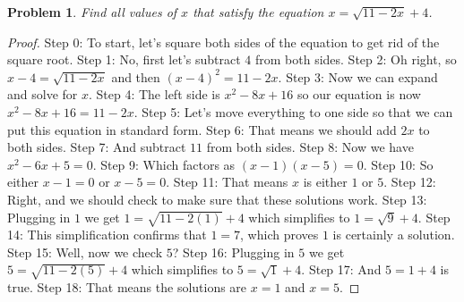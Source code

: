 \documentclass{article}
\newtheorem{theorem}{Problem}
\begin{document}
\begin{theorem}
Find all values of $x$ that satisfy the equation $x = \!\sqrt{11-2x} + 4$.
\end{theorem}

\begin{proof}
Step 0: To start, let's square both sides of the equation to get rid of the square root.
Step 1: No, first let's subtract $4$ from both sides.
Step 2: Oh right, so $x-4=\sqrt{11-2x}$ and then $(x-4)^2=11-2x$.
Step 3: Now we can expand and solve for $x$.
Step 4: The left side is $x^2-8x+16$ so our equation is now $x^2-8x+16=11-2x$.
Step 5: Let's move everything to one side so that we can put this equation in standard form.
Step 6: That means we should add $2x$ to both sides.
Step 7: And subtract $11$ from both sides.
Step 8: Now we have $x^2-6x+5=0$.
Step 9: Which factors as $(x-1)(x-5)=0$.
Step 10: So either $x-1=0$ or $x-5=0$.
Step 11: That means $x$ is either $1$ or $5$.
Step 12: Right, and we should check to make sure that these solutions work.
Step 13: Plugging in $1$ we get $1=\sqrt{11-2(1)}+4$ which simplifies to $1=\sqrt{9}+4$.
Step 14: This simplification confirms that $1=7$, which proves $1$ is certainly a solution.
Step 15: Well, now we check $5$?
Step 16: Plugging in $5$ we get $5=\sqrt{11-2(5)}+4$ which simplifies to $5=\sqrt{1}+4$.
Step 17: And $5=1+4$ is true.
Step 18: That means the solutions are $x=1$ and $x=5$.
\end{proof}
\end{document}
